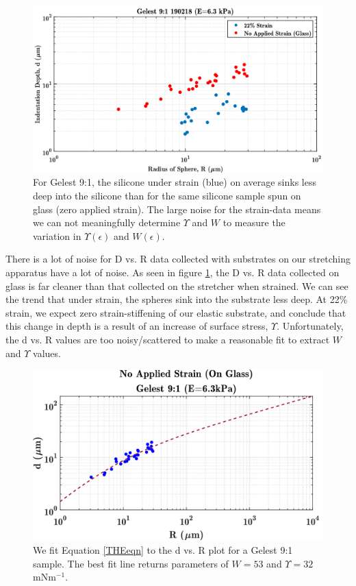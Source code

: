 \begin{figure}[h!]
	\centering
	\includegraphics[width=\linewidth]{Chapters/Figures/g190218_glass_vs_22percent_dvsR.pdf}
	\caption[Glass vs. Stretched d vs. R]{For Gelest 9:1, the silicone under strain (blue) on average sinks less deep into the silicone than for the same silicone sample spun on glass (zero applied strain). The large noise for the strain-data means we can not meaningfully determine $ \Upsilon $ and $ W $ to measure the variation in $ \Upsilon(\epsilon)$ and $W(\epsilon)$.}
	\label{fig:glassvsstretched190218}
\end{figure}

There is a lot of noise for D vs. R data collected with substrates on our stretching apparatus have a lot of noise. As seen in figure \ref{fig:glassvsstretched190218}, the D vs. R data collected on glass is far cleaner than that collected on the stretcher when strained. We can see the trend that under strain, the spheres sink into the substrate less deep. At 22\% strain, we expect zero strain-stiffening of our elastic substrate, and conclude that this change in depth is a result of an increase of surface stress, $ \Upsilon $. Unfortunately, the d vs. R values are too noisy/scattered to make a reasonable fit to extract $ W $ and $ \Upsilon $ values.

\begin{figure}[h!]
	\centering
	\includegraphics[width=\linewidth]{Chapters/Figures/w_ups_fit_G9-1}
	\caption[Gelest W-$\Upsilon$ Fit]{We fit Equation \ref{THEeqn} to the d vs. R plot for a Gelest 9:1 sample. The best fit line returns parameters of $ W=53 $  and $ \Upsilon=32 $ mNm$^{-1}$.}
	\label{fig:wupsfitg9-1}
\end{figure}

